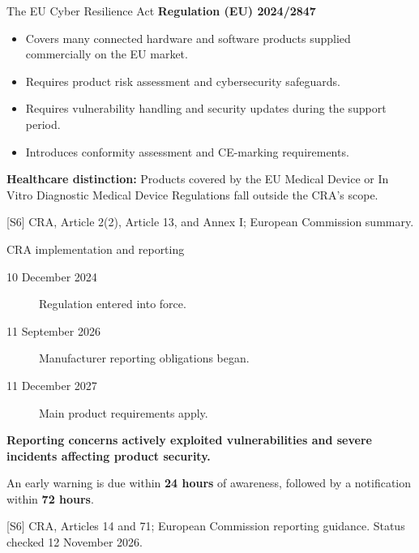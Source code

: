 \documentclass[aspectratio=169,12pt]{beamer}
\newcommand{\source}[1]{\par\vfill{\fontsize{6.5}{7.5}\selectfont\color{Muted}#1\par}}
\newcommand{\gap}{\par\vspace{2mm}}
\begin{document}
\begin{frame}{The EU Cyber Resilience Act}
\textbf{Regulation (EU) 2024/2847}
\gap
\begin{itemize}
\item Covers many connected hardware and software products
supplied commercially on the EU market.
\item Requires product risk assessment and cybersecurity safeguards.
\item Requires vulnerability handling and security updates
during the support period.
\item Introduces conformity assessment and CE-marking requirements.
\end{itemize}
\gap
\small
\textbf{Healthcare distinction:} Products covered by the EU
Medical Device or In Vitro Diagnostic Medical Device Regulations
fall outside the CRA's scope.
\source{[S6] CRA, Article 2(2), Article 13, and Annex I; European Commission summary.}
\end{frame}

\begin{frame}{CRA implementation and reporting}
\begin{description}
\item[10 December 2024] Regulation entered into force.
\item[11 September 2026] Manufacturer reporting obligations began.
\item[11 December 2027] Main product requirements apply.
\end{description}
\gap
\textbf{Reporting concerns actively exploited vulnerabilities
and severe incidents affecting product security.}
\gap
An early warning is due within \textbf{24 hours} of awareness,
followed by a notification within \textbf{72 hours}.
\source{[S6] CRA, Articles 14 and 71; European Commission reporting guidance.
Status checked 12 November 2026.}
\end{frame}
\end{document}

